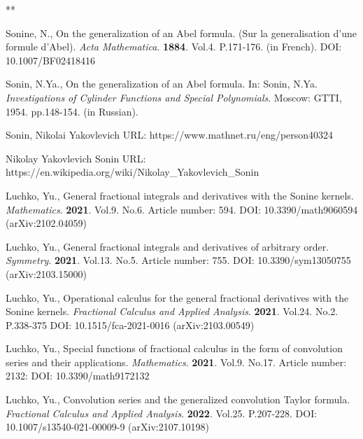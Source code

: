 \documentclass[12pt]{article}
\begin{document}
\begin{thebibliography}{**}

 Sonine, N., 
On the generalization of an Abel formula. 
(Sur la generalisation d'une formule d'Abel). 
\textit{Acta Mathematica}. 
\textbf{1884}. Vol.4. P.171-176. (in French). 
DOI: 10.1007/BF02418416 

 Sonin, N.Ya., 
On the generalization of an Abel formula. 
In: Sonin, N.Ya. 
\textit{Investigations of Cylinder Functions and Special Polynomials}. 
Moscow: GTTI, 1954. pp.148-154. (in Russian). 

 Sonin, Nikolai Yakovlevich
URL: https://www.mathnet.ru/eng/person40324

 Nikolay Yakovlevich Sonin
URL: https://en.wikipedia.org/wiki/Nikolay_Yakovlevich_Sonin





 Luchko, Yu.,
General fractional integrals and derivatives with the Sonine kernels. 
\textit{Mathematics}. 
\textbf{2021}. Vol.9. No.6. Article number: 594. 
DOI: 10.3390/math9060594 (arXiv:2102.04059)

 Luchko, Yu.,
General fractional integrals and derivatives of arbitrary order. 
\textit{Symmetry}. 
\textbf{2021}. Vol.13. No.5. Article number: 755. 
DOI: 10.3390/sym13050755 (arXiv:2103.15000)

 Luchko, Yu.,
Operational calculus for the general fractional derivatives with the Sonine kernels. 
\textit{Fractional Calculus and Applied Analysis}. 
\textbf{2021}. Vol.24. No.2. P.338-375
DOI: 10.1515/fca-2021-0016 (arXiv:2103.00549)

 Luchko, Yu.,
Special functions of fractional calculus in the form of convolution series and their applications. 
\textit{Mathematics}. 
\textbf{2021}. Vol.9. No.17. Article number: 2132: 
DOI: 10.3390/math9172132 


 Luchko, Yu., 
Convolution series and the generalized convolution Taylor formula.
\textit{Fractional Calculus and Applied Analysis}. 
\textbf{2022}. Vol.25. P.207-228.
DOI: 10.1007/s13540-021-00009-9 (arXiv:2107.10198)


\end{thebibliography}
\end{document}
